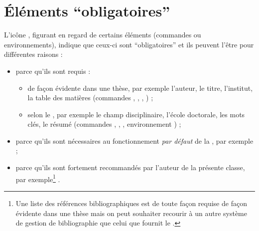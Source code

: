 \section{Éléments \enquote{obligatoires}}
\label{sec:comm-oblig}

L'icône \mandatory{}, figurant en regard de certains éléments (commandes ou
environnements), indique que ceux-ci sont \enquote{obligatoires} et ils peuvent
l'être pour différentes raisons :
\begin{itemize}
\item parce qu'ils sont requis :
  \begin{itemize}
  \item de façon évidente dans une thèse, par exemple l'auteur, le titre,
    l'institut, la table des matières (commandes ,
    , , ) ;
  \item selon le \textcite{guidoct}, par exemple le champ disciplinaire,
    l'école doctorale, les mots clés, le résumé (commandes
    , , ,
    environnement ) ;
  \end{itemize}
\item parce qu'ils sont nécessaires au fonctionnement \emph{par défaut} de la
  \yatcl{}, par exemple  ;
\item parce qu'ils sont fortement recommandés par l'auteur de la présente
  classe, par exemple\footnote{Une liste des références bibliographiques est de
    toute façon requise de façon évidente dans une thèse mais on peut souhaiter
    recourir à un autre système de gestion de bibliographie que celui que
    fournit le .}  .
\end{itemize}

